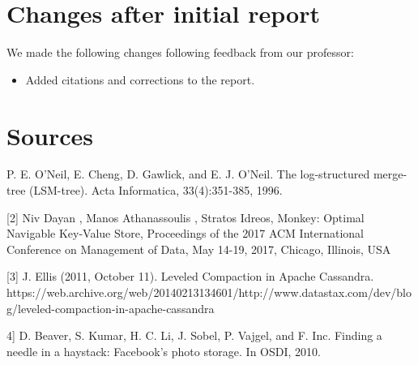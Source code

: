 \documentclass[12pt]{article}
\begin{document}
\section{Changes after initial report}

\indent \indent We made the following changes following feedback from our professor:

\begin{itemize}
\item Added citations and corrections to the report.
\end{itemize}

\section*{Sources}
\indent \indent [1] P. E. O'Neil, E. Cheng, D. Gawlick, and E. J. O'Neil. The
log-structured merge-tree (LSM-tree). Acta Informatica,
33(4):351-385, 1996.

[2] Niv Dayan , Manos Athanassoulis , Stratos Idreos, Monkey: Optimal Navigable Key-Value Store, Proceedings of the 2017 ACM International Conference on Management of Data, May 14-19, 2017, Chicago, Illinois, USA

[3] J. Ellis (2011, October 11). Leveled Compaction in Apache Cassandra. https://web.archive.org/web/20140213134601/http://www.datastax.com/dev/blog/leveled-compaction-in-apache-cassandra 

4] D. Beaver, S. Kumar, H. C. Li, J. Sobel, P. Vajgel, and F. Inc. Finding a needle in a haystack: Facebook's photo storage. In OSDI, 2010.
\end{document}
